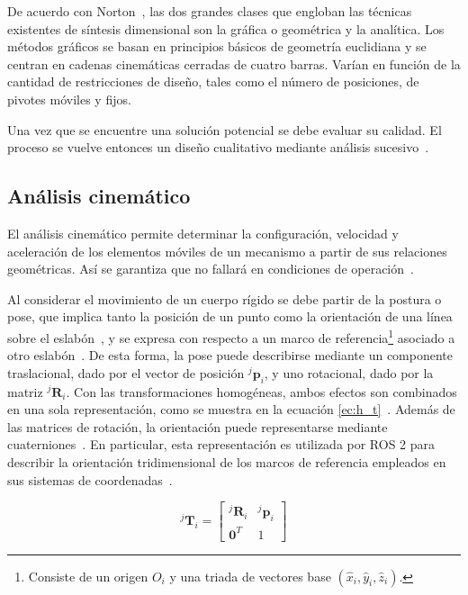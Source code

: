 De acuerdo con Norton~\cite{norton}, las dos grandes clases que engloban las técnicas existentes de síntesis dimensional son la gráfica o geométrica y la analítica. Los métodos gráficos se basan en principios básicos de geometría euclidiana y se centran en cadenas cinemáticas cerradas de cuatro barras. Varían en función de la cantidad de restricciones de diseño, tales como el número de posiciones, de pivotes móviles y fijos.

Una vez que se encuentre una solución potencial se debe evaluar su calidad. El proceso se vuelve entonces un diseño cualitativo mediante análisis sucesivo~\cite{norton}.

\subsection{Análisis cinemático}
El análisis cinemático permite determinar la configuración, velocidad y aceleración de los elementos móviles de un mecanismo a partir de sus relaciones geométricas. Así se garantiza que no fallará en condiciones de operación~\cite{norton}.

Al considerar el movimiento de un cuerpo rígido se debe partir de la postura o pose, que implica tanto la posición de un punto como la orientación de una línea sobre el eslabón~\cite{norton}, y se expresa con respecto a un marco de referencia\footnote{Consiste de un origen $O_i$ y una triada de vectores base $(\hat{x}_i, \hat{y}_i, \hat{z}_i)$.} asociado a otro eslabón~\cite{handbook_kinematics}. De esta forma, la pose puede describirse mediante un componente traslacional, dado por el vector de posición ${}^{j}\mathbf{p}_i$, y uno rotacional, dado por la matriz ${}^{j}\mathbf{R}_i$. Con las transformaciones homogéneas, ambos efectos son combinados en una sola representación, como se muestra en la ecuación \ref{ec:h_t}~\cite{handbook_kinematics}. Además de las matrices de rotación, la orientación puede representarse mediante cuaterniones~\cite{handbook_kinematics}. En particular, esta representación es utilizada por ROS 2 para describir la orientación tridimensional de los marcos de referencia empleados en sus sistemas de coordenadas~\cite{ros2_quaternion}.

\begin{equation}
\label{ec:h_t}
    {}^{j}\mathbf{T}_i=
    \begin{bmatrix}
        {}^{j}\mathbf{R}_i & {}^{j}\mathbf{p}_i \\
        \mathbf{0}^{T}     & 1
    \end{bmatrix}
\end{equation}

